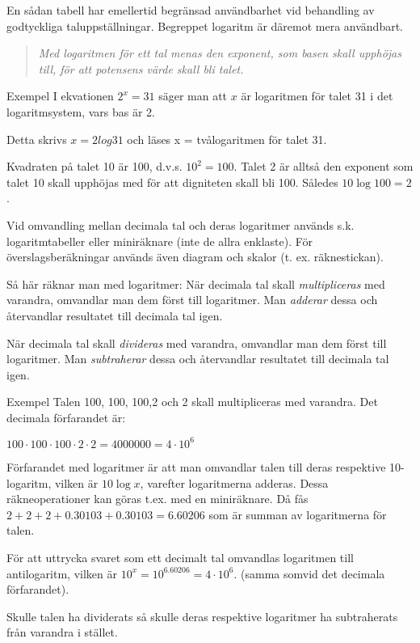 En sådan tabell har emellertid begränsad
användbarhet vid behandling av godtyckliga
taluppställningar. Begreppet logaritm är däremot mera användbart.

\begin{quote}\emph{
Med logaritmen för ett tal menas den exponent, som basen skall upphöjas till,
för att potensens värde skall bli talet.
}\end{quote}

Exempel
I ekvationen $2^x = 31$ säger man att $x$ är logaritmen för talet 31 i det
logaritmsystem, vars bas är 2.

Detta skrivs $x= 2log 31$ och läses x = tvålogaritmen för talet 31.

Kvadraten på talet 10 är 100, d.v.s. $10^2 = 100$. Talet 2 är alltså den
exponent som talet 10 skall upphöjas med för att digniteten skall bli 100.
Således $10\log 100 = 2$.

Vid omvandling mellan decimala tal och deras logaritmer används s.k.
logaritmtabeller eller miniräknare (inte de allra enklaste). För
överslagsberäkningar används även diagram och skalor (t. ex. räknestickan).

Så här räknar man med logaritmer:
När decimala tal skall \emph{multipliceras} med varandra, omvandlar man dem
först till logaritmer. Man \emph{adderar} dessa och återvandlar resultatet till
decimala tal igen.

När decimala tal skall \emph{divideras} med varandra, omvandlar man dem först
till logaritmer. Man \emph{subtraherar} dessa och återvandlar resultatet till
decimala tal igen.

Exempel
Talen 100, 100, 100,2 och 2 skall multipliceras med varandra.
Det decimala förfarandet är:

$100 \cdot 100 \cdot 100 \cdot 2 \cdot 2 = 4000000 = 4 \cdot 10^6$

Förfarandet med logaritmer är att man omvandlar talen till deras respektive
10-logaritm, vilken är $10\log x$, varefter logaritmerna adderas. Dessa
räkneoperationer kan göras t.ex. med en miniräknare. Då fås
$2 + 2 + 2 + 0.30103 + 0.30103 = 6.60206$ som är summan av logaritmerna för
talen.

För att uttrycka svaret som ett decimalt tal omvandlas logaritmen till
antilogaritm, vilken är $10^x = 10^{6.60206} = 4 \cdot 10^6$.
(samma somvid det decimala förfarandet).

Skulle talen ha dividerats så skulle deras respektive logaritmer ha subtraherats
från varandra i stället.

